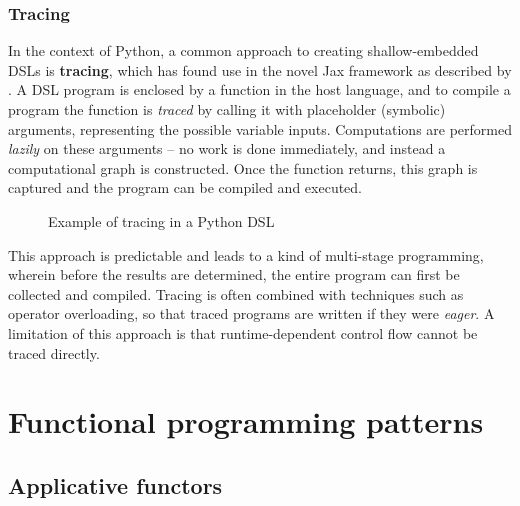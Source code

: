 \subsubsection{Tracing}

In the context of Python, a common approach to creating shallow-embedded DSLs is \textbf{tracing}, which has found use in the novel Jax framework as described by \textcite{frostig2018compiling}. A DSL program is enclosed by a function in the host language, and to compile a program the function is \textit{traced} by calling it with placeholder (symbolic) arguments, representing the possible variable inputs. Computations are performed \textit{lazily} on these arguments -- no work is done immediately, and instead a computational graph is constructed. Once the function returns, this graph is captured and the program can be compiled and executed.
\begin{figure}[ht]
    \caption{Example of tracing in a Python DSL}
    \label{fig:tracing}
\end{figure}
This approach is predictable and leads to a kind of multi-stage programming, wherein before the results are determined, the entire program can first be collected and compiled. Tracing is often combined with techniques such as operator overloading, so that traced programs are written if they were \textit{eager}. A limitation of this approach is that runtime-dependent control flow cannot be traced directly.

\section{Functional programming patterns}

\subsection{Applicative functors}

